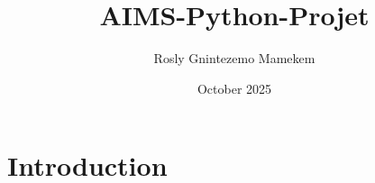 \documentclass{article}
\title{AIMS-Python-Projet}
\author{Rosly Gnintezemo Mamekem}
\date{October 2025}
\begin{document}
\maketitle

\section{Introduction}
\end{document}
